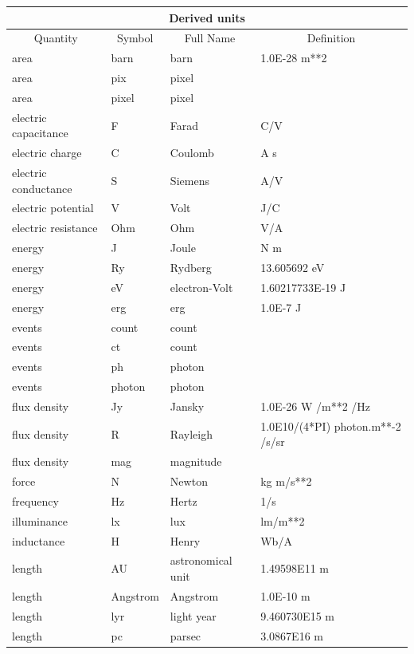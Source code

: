 \documentclass[twoside,11pt]{starlink}
\begin{document}
\begin{table}[htbp]
\begin{center}
\begin{small}
\begin{tabular}{|l|l|l|l|}
\hline
\multicolumn{4}{|c|}{{\large Derived units}} \\ \hline
\multicolumn{1}{|c|}{Quantity} & \multicolumn{1}{|c|}{Symbol} &
\multicolumn{1}{c|}{Full Name} & \multicolumn{1}{c|}{Definition} \\ \hline
area & barn & barn & 1.0E-28 m**2 \\
area & pix & pixel & \\
area & pixel & pixel & \\
electric capacitance & F & Farad & C/V \\
electric charge & C & Coulomb & A s \\
electric conductance & S & Siemens & A/V \\
electric potential & V & Volt & J/C \\
electric resistance & Ohm & Ohm & V/A \\
energy & J & Joule & N m \\
energy & Ry & Rydberg & 13.605692 eV \\
energy & eV & electron-Volt & 1.60217733E-19 J \\
energy & erg & erg & 1.0E-7 J \\
events & count & count & \\
events & ct & count & \\
events & ph & photon & \\
events & photon & photon & \\
flux density & Jy & Jansky & 1.0E-26 W /m**2 /Hz \\
flux density & R & Rayleigh & 1.0E10/(4*PI) photon.m**-2 /s/sr \\
flux density & mag & magnitude & \\
force & N & Newton & kg m/s**2 \\
frequency & Hz & Hertz & 1/s \\
illuminance & lx & lux & lm/m**2 \\
inductance & H & Henry & Wb/A \\
length & AU & astronomical unit & 1.49598E11 m \\
length & Angstrom & Angstrom & 1.0E-10 m \\
length & lyr & light year & 9.460730E15 m \\
length & pc & parsec & 3.0867E16 m \\

\end{tabular}
\end{small}
\end{center}
\end{table}
\end{document}
